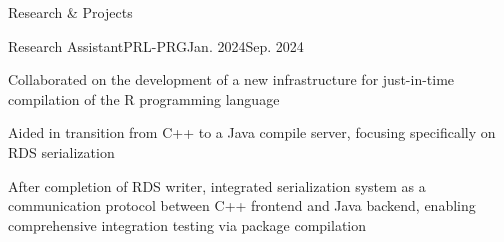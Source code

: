 \documentclass{resume} %
\begin{document}
\begin{rSection}{Research \& Projects}
  \begin{rItem}{Research Assistant}{PRL-PRG}{Jan. 2024}{Sep. 2024}
    \item Collaborated on the development of a new infrastructure for just-in-time compilation of the R programming language
    \item Aided in transition from C++ to a Java compile server, focusing specifically on RDS serialization
    \item After completion of RDS writer, integrated serialization system as a communication protocol between C++ frontend and Java backend, enabling comprehensive integration testing via package compilation

  \end{rItem}


\end{rSection}
\end{document}
